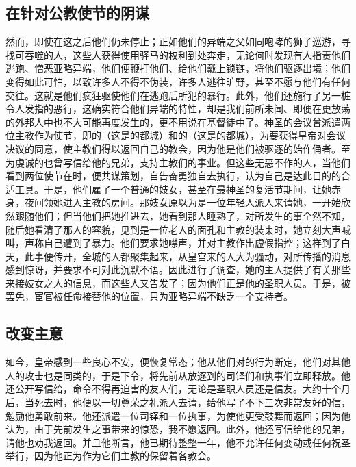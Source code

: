 
\subsection{在针对公教使节的阴谋}

然而，即使在这之后他们仍未停止；正如他们的异端之父如同咆哮的狮子巡游，寻找可吞噬的人，这些人获得使用驿马的权利到处奔走，无论何时发现有人指责他们逃跑、憎恶亚略异端，他们便鞭打他们、给他们戴上锁链，将他们驱逐出境；他们变得如此可怕，以致许多人不得不伪装，许多人逃往旷野，甚至不愿与他们有任何交往。这就是他们疯狂驱使他们在逃跑后所犯的暴行。此外，他们还施行了另一桩令人发指的恶行，这确实符合他们异端的特性，却是我们前所未闻、即便在更放荡的外邦人中也不大可能再度发生的，更不用说在基督徒中了。神圣的会议曾派遣两位主教作为使节，即的（这是的都城）和的（这是的都城），为要获得皇帝对会议决议的同意，使主教们得以返回自己的教会，因为他是他们被驱逐的始作俑者。至为虔诚的也曾写信给他的兄弟，支持主教们的事业。但这些无恶不作的人，当他们看到两位使节在时，便共谋策划，自告奋勇独自去执行，认为自己是达此目的的合适工具。于是，他们雇了一个普通的妓女，甚至在最神圣的复活节期间，让她赤身，夜间领她进入主教的房间。那妓女原以为是一位年轻人派人来请她，一开始欣然跟随他们；但当他们把她推进去，她看到那人睡熟了，对所发生的事全然不知，随后她看清了那人的容貌，见到是一位老人的面孔和主教的装束时，她立刻大声喊叫，声称自己遭到了暴力。他们要求她噤声，并对主教作出虚假指控；这样到了白天，此事便传开，全城的人都聚集起来，从皇宫来的人大为骚动，对所传播的消息感到惊讶，并要求不可对此沉默不语。因此进行了调查，她的主人提供了有关那些来接妓女之人的信息，而这些人又告发了；因为他们正是他的圣职人员。于是，被罢免，宦官被任命接替他的位置，只为亚略异端不缺乏一个支持者。\par


\subsection{改变主意}

如今，皇帝感到一些良心不安，便恢复常态；他从他们对的行为断定，他们对其他人的攻击也是同类的，于是下令，将先前从放逐到的司铎们和执事们立即释放。他还公开写信给，命令不得再迫害的友人们，无论是圣职人员还是信友。大约十个月后，当死去时，他便以一切尊荣之礼派人去请，给他写了不下三次非常友好的信，勉励他勇敢前来。他还派遣一位司铎和一位执事，为使他更受鼓舞而返回；因为他认为，由于先前发生之事带来的惊恐，我不愿返回。此外，他还写信给他的兄弟，请他也劝我返回。并且他断言，他已期待整整一年，他不允许任何变动或任何祝圣举行，因为他正为作为它们主教的保留着各教会。\par

